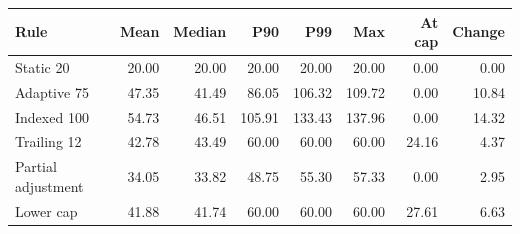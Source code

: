 \begin{tabular}{lrrrrrrr}
\toprule
Rule & Mean & Median & P90 & P99 & Max & At cap & Change \\
\midrule
Static 20 & 20.00 & 20.00 & 20.00 & 20.00 & 20.00 & 0.00 & 0.00 \\
Adaptive 75 & 47.35 & 41.49 & 86.05 & 106.32 & 109.72 & 0.00 & 10.84 \\
Indexed 100 & 54.73 & 46.51 & 105.91 & 133.43 & 137.96 & 0.00 & 14.32 \\
Trailing 12 & 42.78 & 43.49 & 60.00 & 60.00 & 60.00 & 24.16 & 4.37 \\
Partial adjustment & 34.05 & 33.82 & 48.75 & 55.30 & 57.33 & 0.00 & 2.95 \\
Lower cap & 41.88 & 41.74 & 60.00 & 60.00 & 60.00 & 27.61 & 6.63 \\
\bottomrule
\end{tabular}
